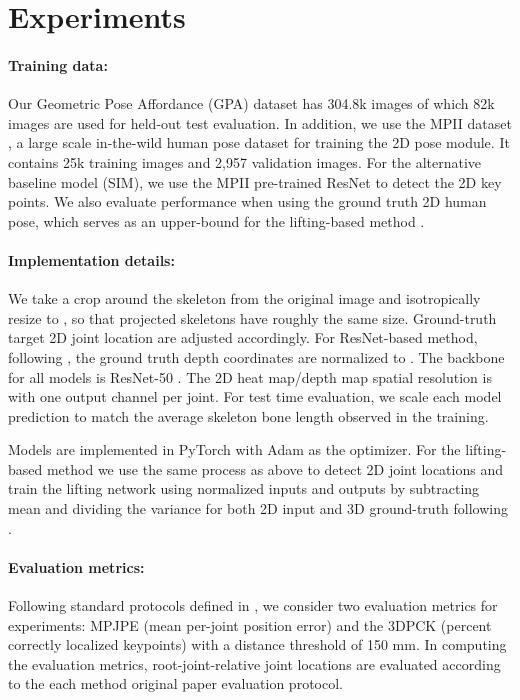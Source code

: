 \documentclass[times,referee,twocolumn,final,authoryear]{elsarticle}
\begin{document}
\section{Experiments}



\paragraph{Training data:} Our Geometric Pose Affordance (GPA) dataset has 304.8k images
of which 82k images are used for held-out test evaluation.  In addition, we use the 
MPII dataset \citep{mpii}, a large scale in-the-wild human pose dataset for training the 
2D pose module. It contains 25k training images and 2,957 validation images.
For the alternative baseline model (SIM), we use the MPII pre-trained ResNet \cite{xiao2018simple} 
to detect the 2D key points. We also evaluate performance when using the ground truth 
2D human pose, which serves as an upper-bound for the lifting-based method \cite{simple}. 

\paragraph{Implementation details:} We take a crop around the skeleton from the
original  image and isotropically resize to , so that projected skeletons have roughly the same size. Ground-truth target
2D joint location are adjusted accordingly. For ResNet-based method, following \cite{Zhou_2017_ICCV}, the
ground truth depth coordinates are normalized to .  The backbone for
all models is ResNet-50 \citep{resnet}. The 2D heat map/depth map
spatial resolution is  with one output channel per joint.
For test time 
evaluation, we scale each model prediction to match the average skeleton bone length
observed in the training. 

Models are
implemented in PyTorch with Adam as the optimizer. For the lifting-based method 
we use the same process as above to detect 2D joint locations and train the 
lifting network using normalized inputs and outputs by subtracting mean and 
dividing the variance for both 2D input and 3D ground-truth following \cite{simple}.

\paragraph{Evaluation metrics:} Following standard protocols defined in
\citep{mono_3dhp2017,h36m_pami}, we consider two evaluation metrics for
experiments: MPJPE (mean per-joint position error) and the 3DPCK (percent
correctly localized keypoints) with a distance threshold of 150 mm.  In
computing the evaluation metrics, root-joint-relative joint locations are
evaluated according to the each method original paper evaluation protocol. 
\end{document}
